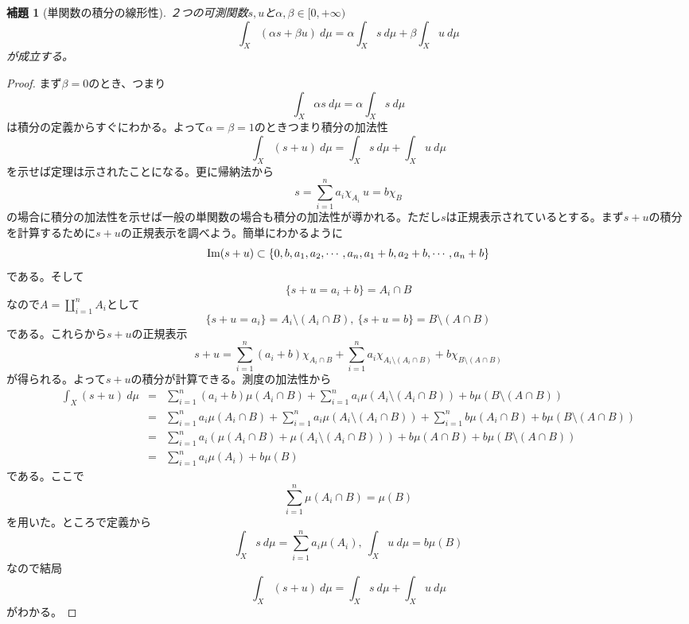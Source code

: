 \documentclass[leqno]{jsarticle}
\newtheorem{lem}[thm]{補題}
\newcommand{\mgn}{\infty}
\newcommand{\dpst}{\displaystyle}
\newcommand{\al}{\alpha}
\newcommand{\be}{\beta}
\begin{document}
\begin{lem}[単関数の積分の線形性]
２つの可測関数$s,u$と$\al,\be\in [0,+\mgn)$
\[
\int_X (\al s +\be u)\ d\mu= \al \int_X s\ d\mu+\be \int_X u\ d\mu
\]
が成立する。
\end{lem}
\begin{proof}まず$\be=0$のとき、つまり
\[
\int_X \al s \ d\mu=\al \int_Xs\ d\mu
\]
は積分の定義からすぐにわかる。よって$\al=\be=1$のときつまり積分の加法性
\[
\int_X ( s + u)\ d\mu= \int_X s\ d\mu+\int_X u\ d\mu
\]を示せば定理は示されたことになる。更に帰納法から
\[
s=\sum_{i=1}^na_i\chi_{A_i}\ u=b\chi_{B}
\]
の場合に積分の加法性を示せば一般の単関数の場合も積分の加法性が導かれる。ただし$s$は正規表示されているとする。まず$s+u$の積分
を計算するために$s+u$の正規表示を調べよう。簡単にわかるように
\[
{\rm Im}(s+u)\subset \{0,b,a_1,a_2,\cdots ,a_n,a_1+b,a_2+b,\cdots ,a_n+b\}
\]
である。そして
\[
\{s+u=a_i+b\}=A_i\cap B
\]
なので$\dpst A=\coprod_{i=1}^nA_i$として
\[
\{s+u=a_i\}=A_i\setminus (A_i\cap B),\ \{s+u=b\}=B\setminus (A\cap B)
\]
である。これらから$s+u$の正規表示
\[
s+u=\sum_{i=1}^n(a_i+b)\chi_{A_i\cap B}+\sum_{i=1}^na_i\chi_{A_i\setminus (A_i\cap B)}+
b\chi_{B\setminus (A\cap B)}
\]
が得られる。よって$s+u$の積分が計算できる。測度の加法性から
\begin{eqnarray*}
\int_{X}(s+u)\ d\mu&=&\sum_{i=1}^n(a_i+b)\mu(A_i\cap B)+\sum_{i=1}^na_i\mu(A_i\setminus (A_i\cap B))+
b\mu(B\setminus (A\cap B))\\ 
&=&\sum_{i=1}^na_i\mu(A_i\cap B)+\sum_{i=1}^na_i\mu(A_i\setminus (A_i\cap B))+
\sum_{i=1}^nb\mu(A_i\cap B)+b\mu(B\setminus (A\cap B))\\ 
&=&\sum_{i=1}^na_i(\mu(A_i\cap B)+\mu(A_i\setminus (A_i\cap B)))+
b\mu(A\cap B)+b\mu(B\setminus (A\cap B))\\ 
&=&\sum_{i=1}^na_i\mu(A_i)+b\mu(B)
\end{eqnarray*}
である。ここで
\[
\sum_{i=1}^n\mu(A_i\cap B)=\mu(B)
\]を用いた。ところで定義から
\[
\int_X s\ d\mu=\sum_{i=1}^na_i\mu(A_i),\ \int_X u \ d\mu=b\mu(B)
\]
なので結局
\[
\int_X ( s + u)\ d\mu= \int_X s\ d\mu+\int_X u\ d\mu
\]
がわかる。
\end{proof}
\end{document}
